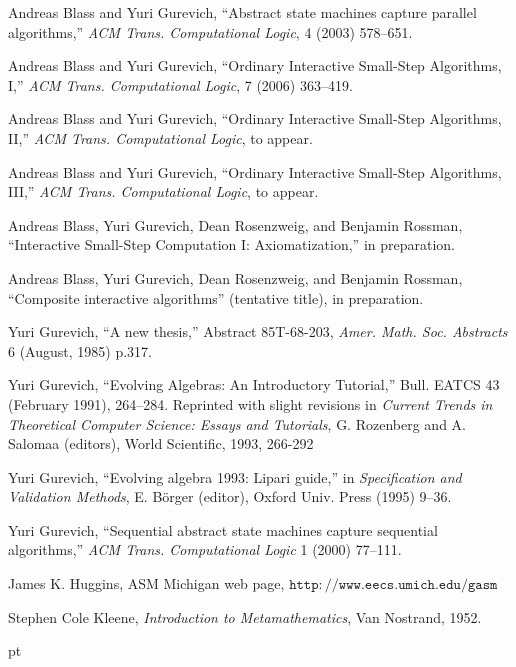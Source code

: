 \documentclass{LMCS}
\theoremstyle{definition}
\newcommand{\ttt}[1]{\ensuremath{\mathtt {#1}}}
\begin{document}
\begin{thebibliography}{99}

 Andreas Blass and Yuri Gurevich, ``Abstract state machines
capture parallel algorithms,'' \emph{ACM Trans. Computational Logic},
4 (2003) 578--651.

Andreas Blass and Yuri Gurevich, ``Ordinary Interactive Small-Step
Algorithms, I,'' \emph{ACM Trans. Computational Logic}, 7 (2006)
363--419. 

Andreas Blass and Yuri Gurevich, ``Ordinary Interactive Small-Step
Algorithms, II,'' \emph{ACM Trans. Computational Logic}, to
appear.

Andreas Blass and Yuri Gurevich, ``Ordinary Interactive Small-Step
Algorithms, III,'' \emph{ACM Trans. Computational Logic}, to
appear.

 Andreas Blass, Yuri Gurevich, Dean Rosenzweig, and
Benjamin Rossman, ``Interactive Small-Step Computation I:
Axiomatization,'' in preparation.

 Andreas Blass, Yuri Gurevich, Dean Rosenzweig, and
Benjamin Rossman, ``Composite interactive algorithms'' (tentative
title), in preparation.

Yuri Gurevich, ``A new thesis,'' Abstract 85T-68-203,
\emph{Amer. Math. Soc. Abstracts} 6 (August, 1985) p.317.

Yuri Gurevich,
``Evolving Algebras: An Introductory Tutorial,''
Bull. EATCS 43 (February 1991), 264--284.
Reprinted with slight revisions in
\emph{Current Trends in Theoretical Computer Science: Essays and Tutorials},
G. Rozenberg and A. Salomaa (editors),
World Scientific, 1993, 266-292

Yuri Gurevich,
``Evolving algebra 1993: Lipari guide,''
in \emph{Specification and Validation Methods},
E. B\"orger (editor), Oxford Univ. Press (1995) 9--36.

Yuri Gurevich, ``Sequential abstract state machines capture sequential
algorithms,'' \emph{ACM Trans. Computational Logic} 1 (2000) 77--111.

 James K. Huggins, ASM Michigan web page,
\href{http://www.eecs.umich.edu/gasm}
    {\ttt{http://www.eecs.umich.edu/gasm}}

 Stephen Cole Kleene, \emph{Introduction to
  Metamathematics},  Van Nostrand, 1952.

\end{thebibliography}
 pt
\end{document}
